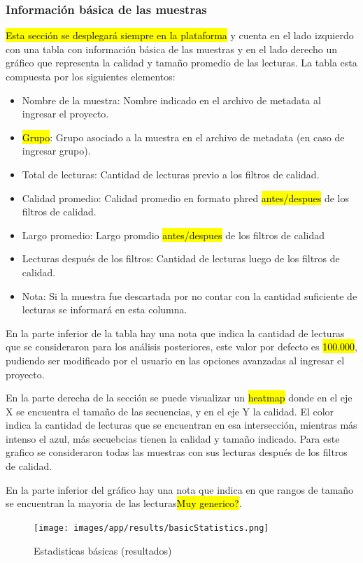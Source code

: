 \subsubsection{Información básica de las muestras}
\hl{Esta sección se desplegará siempre en la plataforma} y cuenta en el lado izquierdo con una tabla con información básica de las muestras y en el lado derecho un gráfico que representa la calidad y tamaño promedio de las lecturas.
La tabla esta compuesta por los siguientes elementos:
\begin{itemize}
    \item Nombre de la muestra: Nombre indicado en el archivo de metadata al ingresar el proyecto.
    \item \hl{Grupo}: Grupo asociado a la muestra en el archivo de metadata (en caso de ingresar grupo).
    \item Total de lecturas: Cantidad de lecturas previo a los filtros de calidad.
    \item Calidad promedio: Calidad promedio en formato phred \hl{antes/despues} de los filtros de calidad.
    \item Largo promedio: Largo promdio \hl{antes/despues} de los filtros de calidad
    \item Lecturas después de los filtros: Cantidad de lecturas luego de los filtros de calidad.
    \item Nota: Si la muestra fue descartada por no contar con la cantidad suficiente de lecturas se informará en esta columna.
\end{itemize}
En la parte inferior de la tabla hay una nota que indica la cantidad de lecturas que se consideraron para los análisis posteriores, este valor por defecto es \hl{100.000}, pudiendo ser modificado por el usuario en las opciones avanzadas al ingresar el proyecto.

En la parte derecha de la sección se puede visualizar un \hl{heatmap} donde en el eje X se encuentra el tamaño de las secuencias, y en el eje Y la calidad. 
El color indica la cantidad de lecturas que se encuentran en esa intersección, mientras más intenso el azul, más secuebcias tienen la calidad y tamaño indicado.
Para este grafico se consideraron todas las muestras con sus lecturas después de los filtros de calidad.

En la parte inferior del gráfico hay una nota que indica en que rangos de tamaño se encuentran la mayoria de las lecturas\hl{Muy generico?}. 
\begin{figure}[H]
    \texttt{[image: images/app/results/basicStatistics.png]}

    \caption{Estadisticas básicas (resultados)}
    \label{fig:app-results-basicStatistics}
\end{figure}

